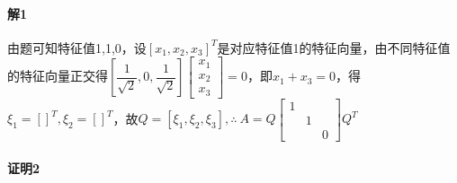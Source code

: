 \paragraph{解1}
由题可知特征值1,1,0，设\([x_1, x_2, x_3]^T\)是对应特征值1的特征向量，由不同特征值的特征向量正交得\([\dfrac{1}{\sqrt{2}}, 0, \dfrac{1}{\sqrt{2}}]\begin{bmatrix}
    x_1 \\ 
    x_2 \\ 
    x_3
\end{bmatrix} = 0\)，即\(x_1 + x_3 = 0\)，得\(\xi_1 = []^T, \xi_2 = []^T\)，故\(Q = [\xi_1, \xi_2, \xi_3], \therefore\ A = Q\begin{bmatrix}
    1 \\ 
    & 1 \\ 
    & & 0
\end{bmatrix}Q^T\)

\paragraph{证明2}


